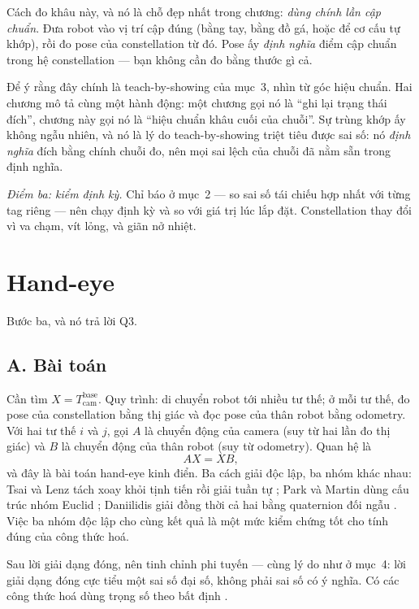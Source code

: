 \documentclass[../../marker.tex]{subfiles}
\begin{document}
Cách đo khâu này, và nó là chỗ đẹp nhất trong chương: \emph{dùng chính lần cập chuẩn}. Đưa robot vào vị trí cập đúng (bằng tay, bằng đồ gá, hoặc để cơ cấu tự khớp), rồi đo pose của constellation từ đó. Pose ấy \emph{định nghĩa} điểm cập chuẩn trong hệ constellation --- bạn không cần đo bằng thước gì cả.

Để ý rằng đây chính là teach-by-showing của  mục~3, nhìn từ góc hiệu chuẩn. Hai chương mô tả cùng một hành động: một chương gọi nó là ``ghi lại trạng thái đích'', chương này gọi nó là ``hiệu chuẩn khâu cuối của chuỗi''. Sự trùng khớp ấy không ngẫu nhiên, và nó là lý do teach-by-showing triệt tiêu được sai số: nó \emph{định nghĩa} đích bằng chính chuỗi đo, nên mọi sai lệch của chuỗi đã nằm sẵn trong định nghĩa.

\emph{Điểm ba: kiểm định kỳ.} Chỉ báo ở  mục~2 --- so sai số tái chiếu hợp nhất với từng tag riêng --- nên chạy định kỳ và so với giá trị lúc lắp đặt. Constellation thay đổi vì va chạm, vít lỏng, và giãn nở nhiệt.

\section{Hand-eye}

Bước ba, và nó trả lời Q3.

\subsection{A. Bài toán}

Cần tìm \(X = T^{\text{base}}_{\text{cam}}\). Quy trình: di chuyển robot tới nhiều tư thế; ở mỗi tư thế, đo pose của constellation bằng thị giác và đọc pose của thân robot bằng odometry. Với hai tư thế \(i\) và \(j\), gọi \(A\) là chuyển động của camera (suy từ hai lần đo thị giác) và \(B\) là chuyển động của thân robot (suy từ odometry). Quan hệ là
\[
A X = X B,
\]
và đây là bài toán hand-eye kinh điển. Ba cách giải độc lập, ba nhóm khác nhau: Tsai và Lenz tách xoay khỏi tịnh tiến rồi giải tuần tự \cite{tsai1989handeye}; Park và Martin dùng cấu trúc nhóm Euclid \cite{park1994robot}; Daniilidis giải đồng thời cả hai bằng quaternion đối ngẫu \cite{daniilidis1999handeye}. Việc ba nhóm độc lập cho cùng kết quả là một mức kiểm chứng tốt cho tính đúng của công thức hoá.

Sau lời giải dạng đóng, nên tinh chỉnh phi tuyến --- cùng lý do như ở  mục~4: lời giải dạng đóng cực tiểu một sai số đại số, không phải sai số có ý nghĩa. Có các công thức hoá dùng trọng số theo bất định \cite{strobl2006optimal}.
\end{document}

